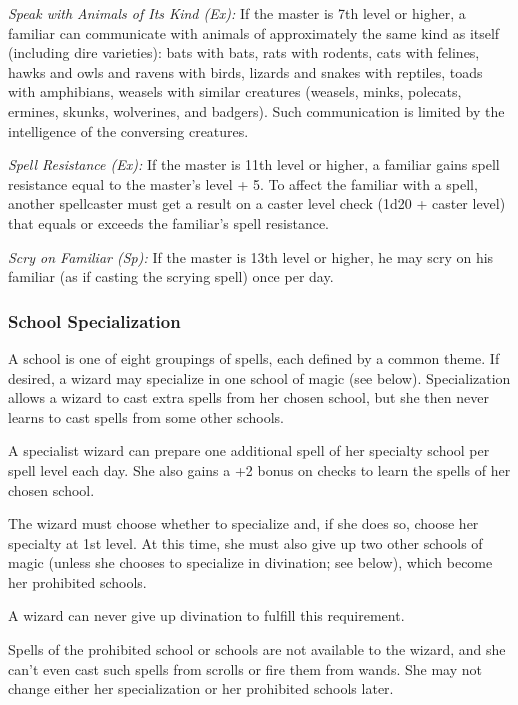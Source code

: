 \textit{Speak with Animals of Its Kind (Ex):} If the master is 7th level or higher, a familiar can communicate with animals of approximately the same kind as itself (including dire varieties): bats with bats, rats with rodents, cats with felines, hawks and owls and ravens with birds, lizards and snakes with reptiles, toads with amphibians, weasels with similar creatures (weasels, minks, polecats, ermines, skunks, wolverines, and badgers). Such communication is limited by the intelligence of the conversing creatures.

\textit{Spell Resistance (Ex):} If the master is 11th level or higher, a familiar gains spell resistance equal to the master's level + 5. To affect the familiar with a spell, another spellcaster must get a result on a caster level check (1d20 + caster level) that equals or exceeds the familiar's spell resistance.

\textit{Scry on Familiar (Sp):} If the master is 13th level or higher, he may scry on his familiar (as if casting the scrying spell) once per day.


\subsubsection{School Specialization}
A school is one of eight groupings of spells, each defined by a common theme. If desired, a wizard may specialize in one school of magic (see below). Specialization allows a wizard to cast extra spells from her chosen school, but she then never learns to cast spells from some other schools.

A specialist wizard can prepare one additional spell of her specialty school per spell level each day. She also gains a +2 bonus on  checks to learn the spells of her chosen school.

The wizard must choose whether to specialize and, if she does so, choose her specialty at 1st level. At this time, she must also give up two other schools of magic (unless she chooses to specialize in divination; see below), which become her prohibited schools.

A wizard can never give up divination to fulfill this requirement.

Spells of the prohibited school or schools are not available to the wizard, and she can't even cast such spells from scrolls or fire them from wands. She may not change either her specialization or her prohibited schools later.

